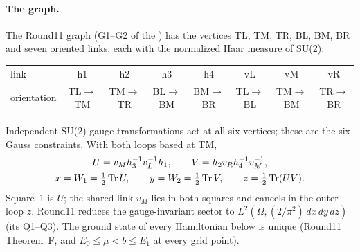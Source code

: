 \paragraph{The graph.}
The Round11 graph (G1--G2 of the
) has the
vertices TL, TM, TR, BL, BM, BR and seven oriented links, each with the
normalized Haar measure of SU(2):
\begin{center}\small
\begin{tabular}{@{}lccccccc@{}}
\toprule
link & h1 & h2 & h3 & h4 & vL & vM & vR\\
orientation & TL$\to$TM & TM$\to$TR & BL$\to$BM & BM$\to$BR & TL$\to$BL &
TM$\to$BM & TR$\to$BR\\
\bottomrule
\end{tabular}
\end{center}
Independent SU(2) gauge transformations act at all six vertices; these are
the six Gauss constraints. With both loops based at TM,
\begin{equation}
 \begin{gathered}
 U=v_Mh_3^{-1}v_L^{-1}h_1,\qquad V=h_2v_Rh_4^{-1}v_M^{-1},\\
 x=W_1=\tfrac12\operatorname{Tr} U,\qquad y=W_2=\tfrac12\operatorname{Tr} V,\qquad z=\tfrac12\operatorname{Tr}(UV).
 \end{gathered}
 \label{eq:az2-loops}
\end{equation}
Square~1 is $U$; the shared link $v_M$ lies in both squares and cancels in
the outer loop $z$. Round11 reduces the gauge-invariant sector to
$L^2(\Omega,(2/\pi^2)\,dx\,dy\,dz)$ (its Q1--Q3). The ground state of every
Hamiltonian below is unique (Round11 Theorem~F, and $E_0\le\mu<b\le E_1$ at
every grid point).

